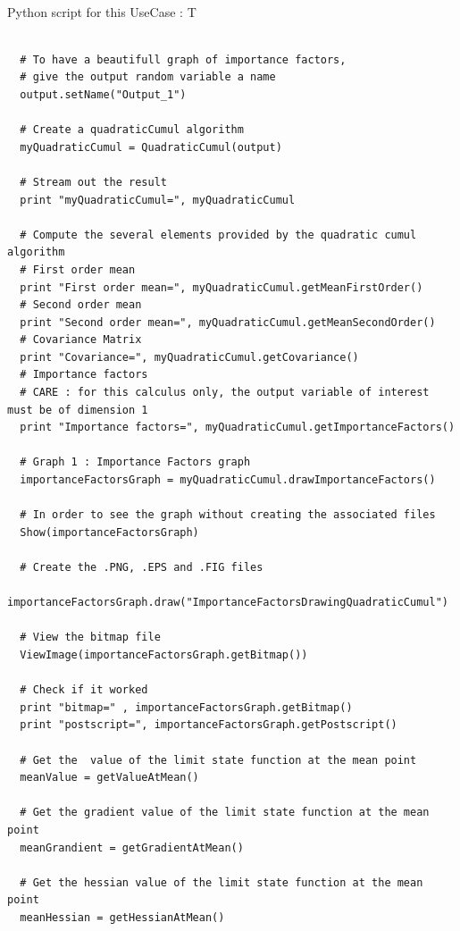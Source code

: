 \textspace\\
Python script for this UseCase :
T
\begin{lstlisting}

  # To have a beautifull graph of importance factors,
  # give the output random variable a name
  output.setName("Output_1")

  # Create a quadraticCumul algorithm
  myQuadraticCumul = QuadraticCumul(output)

  # Stream out the result
  print "myQuadraticCumul=", myQuadraticCumul

  # Compute the several elements provided by the quadratic cumul algorithm
  # First order mean
  print "First order mean=", myQuadraticCumul.getMeanFirstOrder()
  # Second order mean
  print "Second order mean=", myQuadraticCumul.getMeanSecondOrder()
  # Covariance Matrix
  print "Covariance=", myQuadraticCumul.getCovariance()
  # Importance factors
  # CARE : for this calculus only, the output variable of interest must be of dimension 1
  print "Importance factors=", myQuadraticCumul.getImportanceFactors()

  # Graph 1 : Importance Factors graph
  importanceFactorsGraph = myQuadraticCumul.drawImportanceFactors()

  # In order to see the graph without creating the associated files
  Show(importanceFactorsGraph)

  # Create the .PNG, .EPS and .FIG files
  importanceFactorsGraph.draw("ImportanceFactorsDrawingQuadraticCumul")

  # View the bitmap file
  ViewImage(importanceFactorsGraph.getBitmap())

  # Check if it worked
  print "bitmap=" , importanceFactorsGraph.getBitmap()
  print "postscript=", importanceFactorsGraph.getPostscript()

  # Get the  value of the limit state function at the mean point
  meanValue = getValueAtMean()

  # Get the gradient value of the limit state function at the mean point
  meanGrandient = getGradientAtMean()

  # Get the hessian value of the limit state function at the mean point
  meanHessian = getHessianAtMean()
\end{lstlisting}
\textspace\\




